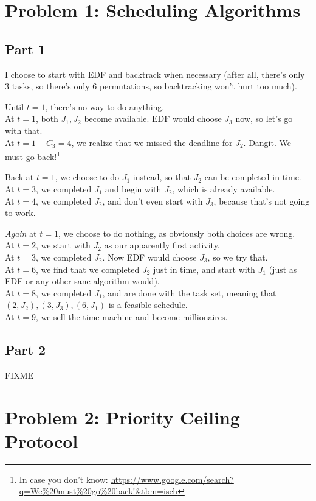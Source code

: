 \documentclass[a4paper,parskip,headheight=38pt]{scrartcl} %
\begin{document}
\section*{Problem 1: Scheduling Algorithms}

\subsection*{Part 1}

I choose to start with EDF and backtrack when necessary (after all,
there's only 3 tasks, so there's only 6 permutations, so backtracking
won't hurt too much).

Until $t=1$, there's no way to do anything.
 \\
At $t=1$, both $J_1, J_2$ become available.  EDF would choose $J_3$
now, so let's go with that.
 \\
At $t=1+C_3=4$, we realize that we missed the deadline for $J_2$.
Dangit.  We must go back!\footnote{In case you don't know:
\url{https://www.google.com/search?q=We\%20must\%20go\%20back!&tbm=isch}}

Back at $t=1$, we choose to do $J_1$ instead, so that $J_2$
can be completed in time.
 \\
At $t=3$, we completed $J_1$ and begin with $J_2$, which is already
available.
 \\
At $t=4$, we completed $J_2$, and don't even start with $J_3$, because
that's not going to work.

\emph{Again} at $t=1$, we choose to do nothing, as obviously both
choices are wrong.
 \\
At $t=2$, we start with $J_2$ as our apparently first activity.
 \\
At $t=3$, we completed $J_2$.  Now EDF would choose $J_3$, so we try
that.
 \\
At $t=6$, we find that we completed $J_2$ just in time, and start with
$J_1$ (just as EDF or any other sane algorithm would).
 \\
At $t=8$, we completed $J_1$, and are done with the task set, meaning
that $(2, J_2), (3, J_3), (6, J_1)$ is a feasible schedule.
 \\
At $t=9$, we sell the time machine and become millionaires.

\subsection*{Part 2}

FIXME


\section*{Problem 2: Priority Ceiling Protocol}
\end{document}
